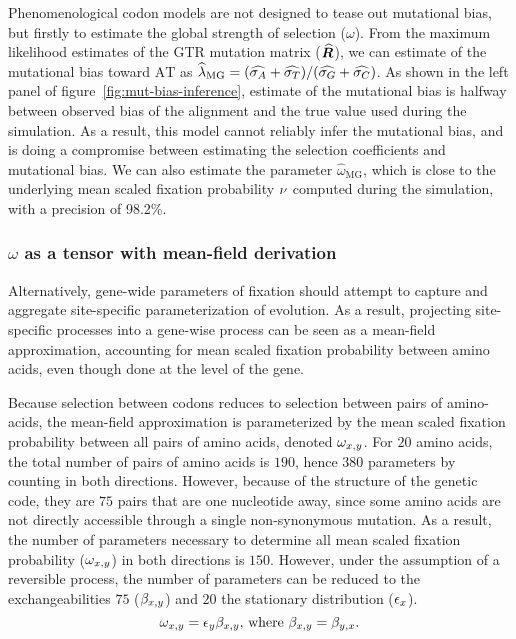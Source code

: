 Phenomenological codon models are not designed to tease out mutational bias, but firstly to estimate the global strength of selection ($\omega$).
From the maximum likelihood estimates of the \acrshort{GTR} mutation matrix ($\widehat{\bm{R}}$), we can estimate of the mutational bias toward $\text{AT}$ as $\widehat{\lambda}_{\text{MG}} = (\widehat{\sigma_A} +\widehat{\sigma_T}) /(\widehat{\sigma_G} +\widehat{\sigma_C}) $.
As shown in the left panel of figure~\ref{fig:mut-bias-inference}, estimate of the mutational bias is halfway between observed bias of the alignment and the true value used during the simulation.
As a result, this model cannot reliably infer the mutational bias, and is doing a compromise between estimating the selection coefficients and mutational bias.
We can also estimate the parameter ${\widehat{\omega}_{\text{MG}}}$, which is close to the underlying mean scaled fixation probability $\nu$ computed during the simulation, with a precision of 98.2\%.

\subsubsection{\texorpdfstring{$\omega$}{ω} as a tensor with mean-field derivation}

Alternatively, gene-wide parameters of fixation should attempt to capture and aggregate site-specific parameterization of evolution.
As a result, projecting site-specific processes into a gene-wise process can be seen as a mean-field approximation, accounting for mean scaled fixation probability between amino acids, even though done at the level of the gene.

Because selection between codons reduces to selection between pairs of amino-acids, the mean-field approximation is parameterized by the mean scaled fixation probability between all pairs of amino acids, denoted $\omega_{x, y}$.
For $20$ amino acids, the total number of pairs of amino acids is $190$, hence $380$ parameters by counting in both directions.
However, because of the structure of the genetic code, they are $75$ pairs that are one nucleotide away, since some amino acids are not directly accessible through a single non-synonymous mutation.
As a result, the number of parameters necessary to determine all mean scaled fixation probability ($\omega_{x, y}$) in both directions is $150$.
However, under the assumption of a reversible process, the number of parameters can be reduced to the exchangeabilities $75$  ($\beta_{x, y}$) and $20$ the stationary distribution ($\epsilon_{x}$).
\begin{equation}
    \omega_{x, y} = \epsilon_{y} \beta_{x, y}\text{, where } \beta_{x, y} = \beta_{y, x}.
\end{equation}

